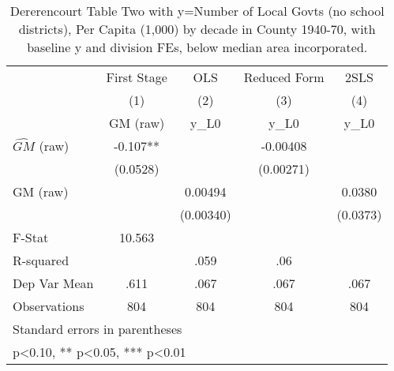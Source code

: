 \begin{table}[htbp]\centering
\def\sym#1{\ifmmode^{#1}\else\(^{#1}\)\fi}
\caption{Dererencourt Table Two with y=Number of Local Govts (no school districts), Per Capita (1,000) by decade in County 1940-70, with baseline y and division FEs, below median area incorporated.}
\begin{tabular}{l*{4}{c}}
\toprule
                    & First Stage   &         OLS   &Reduced Form   &        2SLS   \\
                    &\multicolumn{1}{c}{(1)}&\multicolumn{1}{c}{(2)}&\multicolumn{1}{c}{(3)}&\multicolumn{1}{c}{(4)}\\
                    &\multicolumn{1}{c}{GM  (raw)}&\multicolumn{1}{c}{y\_L0}&\multicolumn{1}{c}{y\_L0}&\multicolumn{1}{c}{y\_L0}\\
\midrule
$\hat{GM}$ (raw)    &      -0.107** &               &    -0.00408   &               \\
                    &    (0.0528)   &               &   (0.00271)   &               \\
\addlinespace
GM  (raw)           &               &     0.00494   &               &      0.0380   \\
                    &               &   (0.00340)   &               &    (0.0373)   \\
\midrule
F-Stat              &      10.563   &               &               &               \\
R-squared           &               &        .059   &         .06   &               \\
Dep Var Mean        &        .611   &        .067   &        .067   &        .067   \\
Observations        &         804   &         804   &         804   &         804   \\
\bottomrule
\multicolumn{5}{l}{\footnotesize Standard errors in parentheses}\\
\multicolumn{5}{l}{\footnotesize * p<0.10, ** p<0.05, *** p<0.01}\\
\end{tabular}
\end{table}
